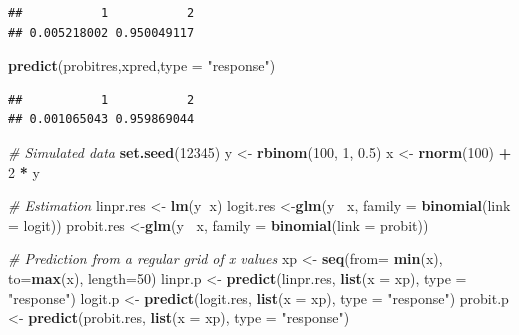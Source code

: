 \documentclass[]{book}
\newenvironment{Shaded}{\begin{snugshade}}{\end{snugshade}}
\newcommand{\CommentTok}[1]{\textcolor[rgb]{0.56,0.35,0.01}{\textit{#1}}}
\newcommand{\DataTypeTok}[1]{\textcolor[rgb]{0.13,0.29,0.53}{#1}}
\newcommand{\DecValTok}[1]{\textcolor[rgb]{0.00,0.00,0.81}{#1}}
\newcommand{\FloatTok}[1]{\textcolor[rgb]{0.00,0.00,0.81}{#1}}
\newcommand{\KeywordTok}[1]{\textcolor[rgb]{0.13,0.29,0.53}{\textbf{#1}}}
\newcommand{\NormalTok}[1]{#1}
\newcommand{\OperatorTok}[1]{\textcolor[rgb]{0.81,0.36,0.00}{\textbf{#1}}}
\newcommand{\StringTok}[1]{\textcolor[rgb]{0.31,0.60,0.02}{#1}}
\begin{document}
\begin{verbatim}
##           1           2 
## 0.005218002 0.950049117
\end{verbatim}

\begin{Shaded}
\begin{Highlighting}[]
\KeywordTok{predict}\NormalTok{(probitres,xpred,}\DataTypeTok{type =} \StringTok{"response"}\NormalTok{)}
\end{Highlighting}
\end{Shaded}

\begin{verbatim}
##           1           2 
## 0.001065043 0.959869044
\end{verbatim}

\begin{Shaded}
\begin{Highlighting}[]
\CommentTok{# Simulated data}
\KeywordTok{set.seed}\NormalTok{(}\DecValTok{12345}\NormalTok{)}
\NormalTok{y <-}\StringTok{ }\KeywordTok{rbinom}\NormalTok{(}\DecValTok{100}\NormalTok{, }\DecValTok{1}\NormalTok{, }\FloatTok{0.5}\NormalTok{)}
\NormalTok{x <-}\StringTok{ }\KeywordTok{rnorm}\NormalTok{(}\DecValTok{100}\NormalTok{) }\OperatorTok{+}\StringTok{ }\DecValTok{2} \OperatorTok{*}\StringTok{ }\NormalTok{y}

\CommentTok{# Estimation }
\NormalTok{linpr.res <-}\StringTok{ }\KeywordTok{lm}\NormalTok{(y}\OperatorTok{~}\NormalTok{x)}
\NormalTok{logit.res <-}\KeywordTok{glm}\NormalTok{(y }\OperatorTok{~}\NormalTok{x, }\DataTypeTok{family =} \KeywordTok{binomial}\NormalTok{(}\DataTypeTok{link =}\NormalTok{ logit))}
\NormalTok{probit.res <-}\KeywordTok{glm}\NormalTok{(y }\OperatorTok{~}\NormalTok{x, }\DataTypeTok{family =} \KeywordTok{binomial}\NormalTok{(}\DataTypeTok{link =}\NormalTok{ probit))}

\CommentTok{# Prediction from a regular grid of x values}
\NormalTok{xp <-}\StringTok{ }\KeywordTok{seq}\NormalTok{(}\DataTypeTok{from=} \KeywordTok{min}\NormalTok{(x), }\DataTypeTok{to=}\KeywordTok{max}\NormalTok{(x), }\DataTypeTok{length=}\DecValTok{50}\NormalTok{)}
\NormalTok{linpr.p <-}\StringTok{ }\KeywordTok{predict}\NormalTok{(linpr.res, }\KeywordTok{list}\NormalTok{(}\DataTypeTok{x =}\NormalTok{ xp), }\DataTypeTok{type =} \StringTok{"response"}\NormalTok{)}
\NormalTok{logit.p <-}\StringTok{ }\KeywordTok{predict}\NormalTok{(logit.res, }\KeywordTok{list}\NormalTok{(}\DataTypeTok{x =}\NormalTok{ xp), }\DataTypeTok{type =} \StringTok{"response"}\NormalTok{)}
\NormalTok{probit.p <-}\StringTok{ }\KeywordTok{predict}\NormalTok{(probit.res, }\KeywordTok{list}\NormalTok{(}\DataTypeTok{x =}\NormalTok{ xp), }\DataTypeTok{type =} \StringTok{"response"}\NormalTok{)}
\end{Highlighting}
\end{Shaded}
\end{document}
